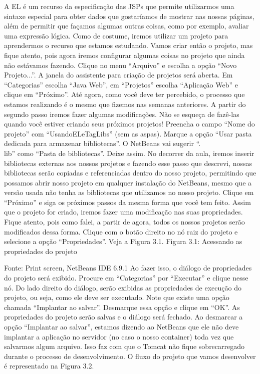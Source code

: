A EL é um recurso da especificação das JSPs que permite utilizarmos uma sintaxe especial para obter dados que gostaríamos de mostrar nas nossas páginas, além de permitir que façamos algumas outras coisas, como por exemplo, avaliar uma expressão lógica. Como de costume, iremos utilizar um projeto para aprendermos o recurso que estamos estudando. Vamos criar então o projeto, mas fique atento, pois agora iremos configurar algumas coisas no projeto que ainda não estávamos fazendo. 
Clique no menu “Arquivo” e escolha a opção “Novo Projeto...”. A janela do assistente para criação de projetos será aberta. Em “Categorias” escolha “Java Web”, em “Projetos” escolha “Aplicação Web” e clique em “Próximo”. Até agora, como você deve ter percebido, o processo que estamos realizando é o mesmo que fizemos nas semanas anteriores. A partir do segundo passo iremos fazer algumas modificações. Não se esqueça de fazê-las quando você estiver criando seus próximos projetos!
Preencha o campo “Nome do projeto” com “UsandoELeTagLibs” (sem as aspas). Marque a opção “Usar pasta dedicada para armazenar bibliotecas”. O NetBeans vai sugerir “.\\lib” como “Pasta de bibliotecas”. Deixe assim. No decorrer da aula, iremos inserir bibliotecas externas aos nossos projetos e fazendo esse passo que descrevi, nossas bibliotecas serão copiadas e referenciadas dentro do nosso projeto, permitindo que possamos abrir nosso projeto em qualquer instalação do NetBeans, mesmo que a versão usada não tenha as bibliotecas que utilizamos no nosso projeto. Clique em “Próximo” e siga os próximos passos da mesma forma que você tem feito.
Assim que o projeto for criado, iremos fazer uma modificação nas suas propriedades. Fique atento, pois como falei, a partir de agora, todos os nossos projetos serão modificados dessa forma. Clique com o botão direito no nó raiz do projeto e selecione a opção “Propriedades”. Veja a Figura 3.1.
Figura 3.1: Acessando as propriedades do projeto
 
Fonte: Print screen, NetBeans IDE 6.9.1
Ao fazer isso, o diálogo de propriedades do projeto será exibido. Procure em “Categorias” por “Executar” e clique nesse nó. Do lado direito do diálogo, serão exibidas as propriedades de execução do projeto, ou seja, como ele deve ser executado. Note que existe uma opção chamada “Implantar ao salvar”. Desmarque essa opção e clique em “OK”. As propriedades do projeto serão salvas e o diálogo será fechado. Ao desmarcar a opção “Implantar ao salvar”, estamos dizendo ao NetBeans que ele não deve implantar a aplicação no servidor (no caso o nosso container) toda vez que salvarmos algum arquivo. Isso faz com que o Tomcat não fique sobrecarregado durante o processo de desenvolvimento.
O fluxo do projeto que vamos desenvolver é representado na Figura 3.2.


